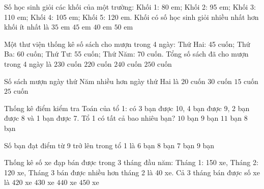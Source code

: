 \begin{ex} %
Số học sinh giỏi các khối của một trường: Khối 1: 80 em; Khối 2: 95 em; Khối 3: 110 em; Khối 4: 105 em; Khối 5: 120 em. Khối có số học sinh giỏi nhiều nhất hơn khối ít nhất là
\choice
{$35$ em}
{$45$ em}
{\True $40$ em}
{$50$ em}
\end{ex}

\begin{ex} %
Một thư viện thống kê số sách cho mượn trong 4 ngày: Thứ Hai: 45 cuốn; Thứ Ba: 60 cuốn; Thứ Tư: 55 cuốn; Thứ Năm: 70 cuốn. Tổng số sách đã cho mượn trong 4 ngày là
\choice
{\True $230$ cuốn}
{$220$ cuốn}
{$240$ cuốn}
{$250$ cuốn}
\end{ex}

\begin{ex} %
Số sách mượn ngày thứ Năm nhiều hơn ngày thứ Hai là
\choice
{$20$ cuốn}
{$30$ cuốn}
{$15$ cuốn}
{\True $25$ cuốn}
\end{ex}

\begin{ex} %
Thống kê điểm kiểm tra Toán của tổ 1: có 3 bạn được 10, 4 bạn được 9, 2 bạn được 8 và 1 bạn được 7. Tổ 1 có tất cả bao nhiêu bạn?
\choice
{\True $10$ bạn}
{$9$ bạn}
{$11$ bạn}
{$8$ bạn}
\end{ex}

\begin{ex} %
Số bạn đạt điểm từ 9 trở lên trong tổ 1 là
\choice
{$6$ bạn}
{$8$ bạn}
{\True $7$ bạn}
{$9$ bạn}
\end{ex}

\begin{ex} %
Thống kê số xe đạp bán được trong 3 tháng đầu năm: Tháng 1: 150 xe, Tháng 2: 120 xe, Tháng 3 bán được nhiều hơn tháng 2 là 40 xe. Cả 3 tháng bán được số xe là
\choice
{$420$ xe}
{\True $430$ xe}
{$440$ xe}
{$450$ xe}
\end{ex}

